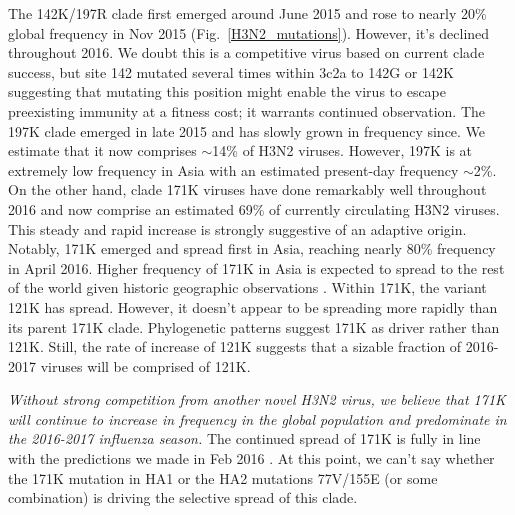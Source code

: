 \documentclass[11pt,oneside,letterpaper]{article}
\begin{document}
The 142K/197R clade first emerged around June 2015 and rose to nearly 20\% global frequency in Nov 2015 (Fig.\ \ref{H3N2_mutations}). However, it's declined throughout 2016. We doubt this is a competitive virus based on current clade success, but site 142 mutated several times within 3c2a to 142G or 142K suggesting that mutating this position might enable the virus to escape preexisting immunity at a fitness cost; it warrants continued observation. The 197K clade emerged in late 2015 and has slowly grown in frequency since. We estimate that it now comprises $\sim$14\% of H3N2 viruses. However, 197K is at extremely low frequency in Asia with an estimated present-day frequency $\sim$2\%. On the other hand, clade 171K viruses have done remarkably well throughout 2016 and now comprise an estimated 69\% of currently circulating H3N2 viruses. This steady and rapid increase is strongly suggestive of an adaptive origin. Notably, 171K emerged and spread first in Asia, reaching nearly 80\% frequency in April 2016. Higher frequency of 171K in Asia is expected to spread to the rest of the world given historic geographic observations \cite{bedford2015global}. Within 171K, the variant 121K has spread. However, it doesn't appear to be spreading more rapidly than its parent 171K clade. Phylogenetic patterns suggest 171K as driver rather than 121K. Still, the rate of increase of 121K suggests that a sizable fraction of 2016-2017 viruses will be comprised of 121K.


\pagebreak

\textit{Without strong competition from another novel H3N2 virus, we believe that 171K will continue to increase in frequency in the global population and predominate in the 2016-2017 influenza season.} The continued spread of 171K is fully in line with the predictions we made in Feb 2016 \cite{feb2016report}. At this point, we can't say whether the 171K mutation in HA1 or the HA2 mutations 77V/155E (or some combination) is driving the selective spread of this clade.
\end{document}
